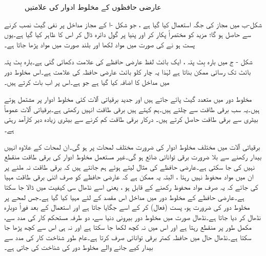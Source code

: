 \begin{figure}
\begin{subfigure}[b]{0.3\textwidth}
\caption{}
\end{subfigure}
\caption{عارضی حافظوں کے مخلوط ادوار کی علامتیں}
\label{شکل_حافظہ_عارضی_حافظوں_کے_مخلوط_ادوار}
\end{figure}
شکل-ب میں مجاز کی جگہ  استعمال کیا گیا ہے ، جو شکل -ا کے مجاز مداخل پر نفی گیٹ نصب کرنے سے حاصل ہو گا؛ مزید  کو مختصراً  پکار کر اور  پنیا پر گول دائرہ ڈال کر اس کا  ظاہر کیا گیا ہے۔یوں  پست ہو نے کی صورت میں مواد لکھا اور بلند صورت میں  مواد پڑھا جاتا ہے۔

شکل - ج میں بارہ بِٹ پتہ ، ایک بائٹ لفظ عارضی حافظے کی علامت دکھائی گئی ہے۔بارہ بِٹ پتہ  بائٹ تک رسائی ممکن بناتا ہے لہٰذا یہ چار کلو بائٹ عارضی حافظہ کی علامت ہے۔اس مخلوط دور میں  مداخل  کا اضافہ کیا گیا ہے جو ہے۔اس پر اب بات کرتے ہیں۔

 مخلوط دور میں متعدد گیٹ پائے جاتے ہیں اور جدید برقیاتی آلات کئی مخلوط ادوار پر مشتمل ہوتے ہیں۔یہ سب برقی طاقت سے چلتے ہیں۔ہم کہتے ہیں برقی طاقت انہیں  رکھتی ہے۔برقیاتی آلات عموماً بیٹری سے برقی طاقت حاصل کرتے ہیں۔ درکار برقی طاقت کم کرنے سے بیٹری زیادہ دیر کارآمد رہتی ہے۔
 
برقیاتی آلات میں مختلف مخلوط ادوار کی ضرورت مختلف لمحات پر ہو گی۔ان لمحات کے علاوہ انہیں بیدار رکھنے سے بلا ضرورت برقی توانائی ضائع ہو گی۔غیر مستعمل مخلوط ادوار کی برقی طاقت منقطع نہیں کی جا سکتی ہے۔عارضی حافظے کی مثال لیتے ہوئے ہم جانتے ہیں کہ برقی طاقت نہ ملنے پر ان میں مواد محفوظ نہیں رہتا ، البتہ یہ ممکن ہے کہ عارضی حافظے کو صرف اتنی برقی طاقت مہیا کی جائے کہ یہ صرف مواد محفوظ رکھنے کے قابل ہو ، یعنی اسے نڈھال سی کیفیت میں ڈالا جا سکتا ہے۔عارضی حافظے کے مخلوط دور میں  مداخل اس مقصد کے لئے مہیا کیا گیا ہے۔جس لمحے پر مخلوط دور کی ضرورت ہو،  پست (فعال) کر کے اسے جگایا جاتا ہے اور استعمال کے بعد فوراً دوبارہ نڈھال کر دیا جاتا ہے۔نڈھال صورت میں مخلوط دور بیرونی دنیا سے، دو طرفہ مستحکم کار کی مدد سے، مکمل طور پر منقطع رہتا ہے اور اس میں نہ کچھ لکھا جا سکتا ہے اور نہ ہی اس سے کچھ پڑھا جا سکتا ہے۔نڈھال حال میں حافظہ کمتر برقی توانائی صرف کرتا ہے۔عام طور شناخت کار کی مدد سے بیدار کیے جانے والے مخلوط دور کی شناخت کی جاتی ہے۔


